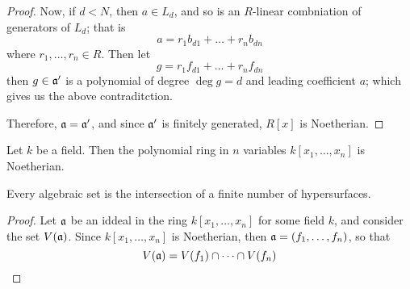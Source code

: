 \begin{proof}
     Now, if $d<N$, then  $a \in L_d$, and so is an  $R$-linear combniation of
     generators of  $L_d$; that is
     \begin{equation*}
         a=r_1b_{d1}+\dots+r_nb_{dn}
     \end{equation*}
     where $r_1, \dots, r_n \in R$. Then let
     \begin{equation*}
         g=r_1f_{d1}+\dots+r_nf_{dn}
     \end{equation*}
     then $g \in \mathfrak{a}'$ is a polynomial of degree  $\deg{g}=d$ and leading
     coefficient $a$; which gives us the above contraditction.

     Therefore, $\mathfrak{a}=\mathfrak{a}'$, and since $\mathfrak{a}'$ is finitely generated,  $R[x]$ is
     Noetherian.
 \end{proof}
 \begin{corollary}
     Let $k$ be a field. Then the polynomial ring in  $n$ variables  $k[x_1,
     \dots, x_n]$ is Noetherian.
 \end{corollary}

 \begin{theorem}\label{1.4.4}
     Every algebraic set is the intersection of a finite number of
     hypersurfaces.
 \end{theorem}
 \begin{proof}
     Let $\mathfrak{a}$ be an iddeal in the ring $k[x_1, \dots, x_n]$ for some field $k$,
     and consider the set $V(\mathfrak{a})$. Since $k[x_1, \dots, x_n]$ is Noetherian,
     then $\mathfrak{a}=(f_1, \dots, f_n)$, so that
     \begin{equation*}
         V(\mathfrak{a})=V(f_1) \cap \dots \cap V(f_n)
     \end{equation*}
 \end{proof}

